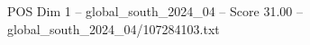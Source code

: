 \begin{textsample}{POS Dim 1 – global\_south\_2024\_04 – Score 31.00 – global\_south\_2024\_04/107284103.txt}
\end{textsample}
